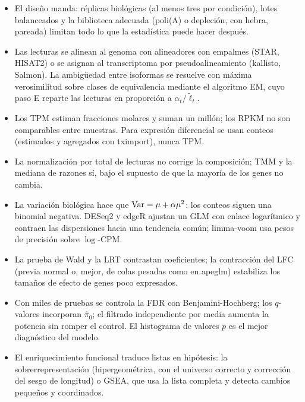 \begin{resumen}
\begin{itemize}
  \item El diseño manda: réplicas biológicas (al menos tres por condición), lotes balanceados y la biblioteca adecuada (poli(A) o depleción, con hebra, pareada) limitan todo lo que la estadística puede hacer después.
  \item Las lecturas se alinean al genoma con alineadores con empalmes (STAR, HISAT2) o se asignan al transcriptoma por pseudoalineamiento (kallisto, Salmon). La ambigüedad entre isoformas se resuelve con máxima verosimilitud sobre clases de equivalencia mediante el algoritmo EM, cuyo paso E reparte las lecturas en proporción a $\alpha_t/\tilde\ell_t$.
  \item Los TPM estiman fracciones molares y suman un millón; los RPKM no son comparables entre muestras. Para expresión diferencial se usan conteos (estimados y agregados con tximport), nunca TPM.
  \item La normalización por total de lecturas no corrige la composición; TMM y la mediana de razones sí, bajo el supuesto de que la mayoría de los genes no cambia.
  \item La variación biológica hace que $\operatorname{Var}=\mu+\alpha\mu^2$: los conteos siguen una binomial negativa. DESeq2 y edgeR ajustan un GLM con enlace logarítmico y contraen las dispersiones hacia una tendencia común; limma-voom usa pesos de precisión sobre $\log$-CPM.
  \item La prueba de Wald y la LRT contrastan coeficientes; la contracción del LFC (previa normal o, mejor, de colas pesadas como en apeglm) estabiliza los tamaños de efecto de genes poco expresados.
  \item Con miles de pruebas se controla la FDR con Benjamini-Hochberg; los $q$-valores incorporan $\hat\pi_0$; el filtrado independiente por media aumenta la potencia sin romper el control. El histograma de valores $p$ es el mejor diagnóstico del modelo.
  \item El enriquecimiento funcional traduce listas en hipótesis: la sobrerrepresentación (hipergeométrica, con el universo correcto y corrección del sesgo de longitud) o GSEA, que usa la lista completa y detecta cambios pequeños y coordinados.
\end{itemize}
\end{resumen}

